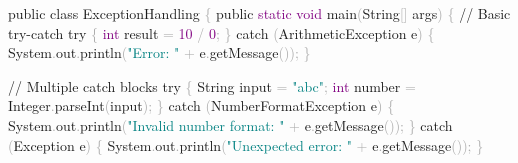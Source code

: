 \documentclass[
  justified,
  openright,
]{tufte-book}
\newcommand{\BuiltInTok}[1]{#1}
\newcommand{\CommentTok}[1]{\textcolor{MidGray}{#1}}
\newcommand{\ControlFlowTok}[1]{\textcolor{BrandBlue}{#1}}
\newcommand{\DataTypeTok}[1]{\textcolor{Purple}{#1}}
\newcommand{\DecValTok}[1]{\textcolor{Purple}{#1}}
\newcommand{\FunctionTok}[1]{\textcolor{BrandBlue}{#1}}
\newcommand{\KeywordTok}[1]{\textcolor{BrandBlue}{#1}}
\newcommand{\NormalTok}[1]{#1}
\newcommand{\OperatorTok}[1]{\textcolor{DarkGray}{#1}}
\newcommand{\StringTok}[1]{\textcolor{Teal}{#1}}
\newenvironment{Shaded}{%
  \begin{snugshade}
}{%
  \end{snugshade}
}
\begin{document}
\begin{Shaded}
\begin{Highlighting}[]
\KeywordTok{public} \KeywordTok{class}\NormalTok{ ExceptionHandling }\OperatorTok{\{}
    \KeywordTok{public} \DataTypeTok{static} \DataTypeTok{void} \FunctionTok{main}\OperatorTok{(}\BuiltInTok{String}\OperatorTok{[]}\NormalTok{ args}\OperatorTok{)} \OperatorTok{\{}
        \CommentTok{// Basic try{-}catch}
        \ControlFlowTok{try} \OperatorTok{\{}
            \DataTypeTok{int}\NormalTok{ result }\OperatorTok{=} \DecValTok{10} \OperatorTok{/} \DecValTok{0}\OperatorTok{;}
        \OperatorTok{\}} \ControlFlowTok{catch} \OperatorTok{(}\BuiltInTok{ArithmeticException}\NormalTok{ e}\OperatorTok{)} \OperatorTok{\{}
            \BuiltInTok{System}\OperatorTok{.}\FunctionTok{out}\OperatorTok{.}\FunctionTok{println}\OperatorTok{(}\StringTok{"Error: "} \OperatorTok{+}\NormalTok{ e}\OperatorTok{.}\FunctionTok{getMessage}\OperatorTok{());}
        \OperatorTok{\}}

        \CommentTok{// Multiple catch blocks}
        \ControlFlowTok{try} \OperatorTok{\{}
            \BuiltInTok{String}\NormalTok{ input }\OperatorTok{=} \StringTok{"abc"}\OperatorTok{;}
            \DataTypeTok{int}\NormalTok{ number }\OperatorTok{=} \BuiltInTok{Integer}\OperatorTok{.}\FunctionTok{parseInt}\OperatorTok{(}\NormalTok{input}\OperatorTok{);}
        \OperatorTok{\}} \ControlFlowTok{catch} \OperatorTok{(}\BuiltInTok{NumberFormatException}\NormalTok{ e}\OperatorTok{)} \OperatorTok{\{}
            \BuiltInTok{System}\OperatorTok{.}\FunctionTok{out}\OperatorTok{.}\FunctionTok{println}\OperatorTok{(}\StringTok{"Invalid number format: "} \OperatorTok{+}\NormalTok{ e}\OperatorTok{.}\FunctionTok{getMessage}\OperatorTok{());}
        \OperatorTok{\}} \ControlFlowTok{catch} \OperatorTok{(}\BuiltInTok{Exception}\NormalTok{ e}\OperatorTok{)} \OperatorTok{\{}
            \BuiltInTok{System}\OperatorTok{.}\FunctionTok{out}\OperatorTok{.}\FunctionTok{println}\OperatorTok{(}\StringTok{"Unexpected error: "} \OperatorTok{+}\NormalTok{ e}\OperatorTok{.}\FunctionTok{getMessage}\OperatorTok{());}
        \OperatorTok{\}}


\end{Highlighting}
\end{Shaded}
\end{document}

